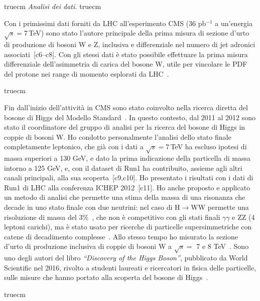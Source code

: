 \documentclass[11pt,twoside,a4paper]{article}
\begin{document}
 truecm
\textit{Analisi dei dati.}
 truecm

Con i primissimi dati forniti da LHC all'esperimento CMS (36 pb$^{-1}$
a un'energia $\sqrt{s}=7$\,TeV) sono stato l'autore principale della
prima misura di sezione d'urto di produzione di bosoni W e Z,
inclusiva e differenziale nel numero di jet adronici
associati~\cite{Chatrchyan:2011ne,Marco:2009dvd,Khachatryan:2010xn,CMS:2011aa}[c6--c8].
Con gli stessi dati \`e stato possibile effettuare la prima misura
differenziale dell'asimmetria di carica del bosone W, utile per
vincolare le PDF del protone nei range di momento esplorati da
LHC~\cite{Chatrchyan:2011jz}.

 truecm

Fin dall'inizio dell'attivit\`a in CMS sono stato coinvolto nella
ricerca diretta del bosone di Higgs del Modello
Standard~\cite{Chatrchyan:2011tz,Chatrchyan:2012tx,Chatrchyan:2012ty}. In
questo contesto, dal 2011 al 2012 sono stato il coordinatore del
gruppo di analisi per la ricerca del bosone di Higgs in coppie di
bosoni W. Ho condotto personalmente l'analisi dello stato finale
completamente leptonico, che gi\`a con i dati a $\sqrt{s}=7$\,TeV ha
escluso ipotesi di massa superiori a 130 GeV, e dato la prima
indicazione della particella di massa intorno a 125 GeV, e, con il
dataset di Run1 ha contribuito, assieme agli altri canali principali,
alla sua
scoperta~\cite{Chatrchyan:2012ufa,Chatrchyan:2013lba,Chatrchyan:2012ufa}[c9,c10].
Ho presentato i risultati con i dati di Run1 di LHC alla conferenza
ICHEP 2012~[c11]. Ho anche proposto e applicato un metodo di analisi
che permette una stima della massa di una risonanza che decade in uno
stato finale con due neutrini: nel caso di H$\to$WW permette una
risoluzione di massa del 3\%~\cite{Chatrchyan:2013iaa}, che non \`e
competitivo con gli stati finali $\gamma\gamma$ e ZZ (4 leptoni
carichi), ma \`e stato usato per ricerche di particelle
supersimmetriche con catene di decadimento
complesse~\cite{Khachatryan:2016epu}. Allo stesso tempo ho misurato la
sezione d'urto di produzione inclusiva di coppie di bosoni W a
$\sqrt{s}=$ 7 e 8 TeV~\cite{Chatrchyan:2013yaa}. Sono uno degli autori
del libro \textit{``Discovery of the Higgs Boson''}, pubblicato da
World Scientific nel 2016, rivolto a studenti laureati e ricercatori
in fisica delle particelle, sulle misure che hanno portato alla
scoperta del bosone di Higgs~\cite{Nisati:2017cst}.

 truecm
\end{document}
